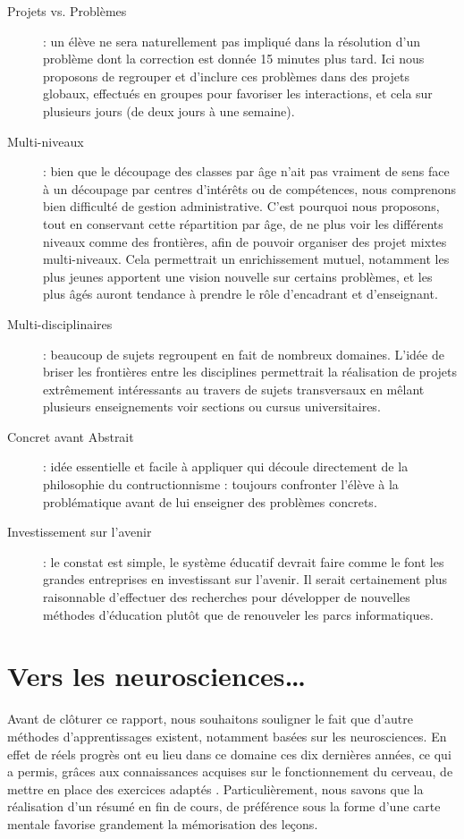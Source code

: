 \begin{description}
  \item[Projets vs. Problèmes] : un élève ne sera naturellement pas impliqué dans la résolution d'un problème dont la correction est donnée 15 minutes plus tard. Ici nous proposons de regrouper et d'inclure ces problèmes dans des projets globaux, effectués en groupes pour favoriser les interactions, et cela sur plusieurs jours (de deux jours à une semaine).
  \item[Multi-niveaux] : bien que le découpage des classes par âge n'ait pas vraiment de sens face à un découpage par centres d'intérêts ou de compétences, nous comprenons bien difficulté de gestion administrative. C'est pourquoi nous proposons, tout en conservant cette répartition par âge, de ne plus voir les différents niveaux comme des frontières, afin de pouvoir organiser des projet mixtes multi-niveaux. Cela permettrait un enrichissement mutuel, notamment les plus jeunes apportent une vision nouvelle sur certains problèmes, et les plus âgés auront tendance à prendre le rôle d'encadrant et d'enseignant.
  \item[Multi-disciplinaires] : beaucoup de sujets regroupent en fait de nombreux domaines. L'idée de briser les frontières entre les disciplines permettrait la réalisation de projets extrêmement intéressants au travers de sujets transversaux en mêlant plusieurs enseignements voir sections ou cursus universitaires.
  \item[Concret avant Abstrait] : idée essentielle et facile à appliquer qui découle directement de la philosophie du contructionnisme : toujours confronter l'élève à la problématique avant de lui enseigner des problèmes concrets.
  \item[Investissement sur l'avenir] : le constat est simple, le système éducatif devrait faire comme le font les grandes entreprises en investissant sur l'avenir. Il serait certainement plus raisonnable d'effectuer des recherches pour développer de nouvelles méthodes d'éducation plutôt que de renouveler les parcs informatiques.
\end{description}

\chapter*{Vers les neurosciences\ldots}
Avant de clôturer ce rapport, nous souhaitons souligner le fait que d'autre méthodes d'apprentissages existent, notamment basées sur les neurosciences. En effet de réels progrès ont eu lieu dans ce domaine ces dix dernières années, ce qui a permis, grâces aux connaissances acquises sur le fonctionnement du cerveau, de mettre en place des exercices adaptés \cite{neurosup}. Particulièrement, nous savons que la réalisation d'un résumé en fin de cours, de préférence sous la forme d'une carte mentale favorise grandement la mémorisation des leçons.

